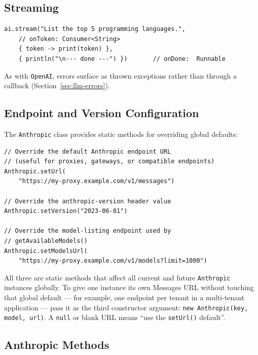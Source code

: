 \subsection{Streaming}

\begin{lstlisting}[style=groovy]
ai.stream("List the top 5 programming languages.",
    // onToken: Consumer<String>
    { token -> print(token) },
    { println("\n--- done ---") })       // onDone:  Runnable
\end{lstlisting}

\noindent
As with \texttt{OpenAI}, errors surface as thrown exceptions rather than through a callback (Section~\ref{sec:llm-errors}).

\subsection{Endpoint and Version Configuration}

The \texttt{Anthropic} class provides static methods for overriding global defaults:

\begin{lstlisting}[style=groovy]
// Override the default Anthropic endpoint URL
// (useful for proxies, gateways, or compatible endpoints)
Anthropic.setUrl(
    "https://my-proxy.example.com/v1/messages")

// Override the anthropic-version header value
Anthropic.setVersion("2023-06-01")

// Override the model-listing endpoint used by
// getAvailableModels()
Anthropic.setModelsUrl(
    "https://my-proxy.example.com/v1/models?limit=1000")
\end{lstlisting}

\noindent
All three are static methods that affect all current and future \texttt{Anthropic} instances globally.  To give one instance its own Messages URL without touching that global default --- for example, one endpoint per tenant in a multi-tenant application --- pass it as the third constructor argument: \texttt{new Anthropic(key, model, url)}.  A \texttt{null} or blank URL means ``use the \texttt{setUrl()} default''.

\subsection{Anthropic Methods}

